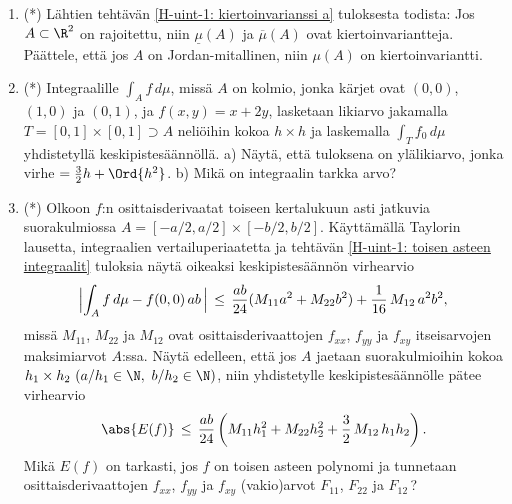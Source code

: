 \begin{enumerate}
\item (*) \label{H-uint-1: kiertoinvarianssi b}
Lähtien tehtävän \ref{H-uint-1: kiertoinvarianssi a} tuloksesta todista: Jos $A\subset\R^2$ on
rajoitettu, niin $\underline{\mu}(A)$ ja $\overline{\mu}(A)$ ovat kiertoinvariantteja.
Päättele, että jos $A$ on Jordan-mitallinen, niin $\mu(A)$ on kiertoinvariantti.

\item (*)
Integraalille $\int_A f\,d\mu$, missä $A$ on kolmio, jonka kärjet ovat $(0,0)$, $(1,0)$ ja
$(0,1)$, ja $f(x,y)=x+2y$, lasketaan likiarvo jakamalla $T=[0,1]\times[0,1] \supset A$
neliöihin kokoa $h \times h$ ja laskemalla $\int_T f_0\,d\mu$ yhdistetyllä keskipistesäännöllä.
a) Näytä, että tuloksena on ylälikiarvo, jonka virhe $=\tfrac{3}{2}h+\Ord{h^2}$. \newline
b) Mikä on integraalin tarkka arvo? 

\item (*) \label{H-uint-1: kp-virhearvio}
Olkoon $f$:n osittaisderivaatat toiseen kertalukuun asti jatkuvia suorakulmiossa
$A=[-a/2,a/2]\times[-b/2,b/2]$. Käyttämällä Taylorin lausetta, integraalien vertailuperiaatetta
ja tehtävän \ref{H-uint-1: toisen asteen integraalit} tuloksia näytä oikeaksi keskipistesäännön
virhearvio
\[
\Bigl|\int_A f\,d\mu - f(0,0)\,ab\,\Bigr|\,\le\,\frac{ab}{24}(M_{11}a^2+M_{22}b^2)
                                                +\frac{1}{16}\,M_{12}\,a^2b^2,
\]
missä $M_{11}$, $M_{22}$ ja $M_{12}$ ovat osittaisderivaattojen $f_{xx}$, $f_{yy}$ ja $f_{xy}$
itseisarvojen maksimiarvot $A$:ssa. Näytä edelleen, että jos $A$ jaetaan suorakulmioihin
kokoa $h_1 \times h_2\ (a/h_1\in\N,\ b/h_2\in\N)$, niin yhdistetylle keskipistesäännölle
pätee virhearvio
\[
\abs{E(f)}\,\le\,\frac{ab}{24}\left(M_{11}h_1^2+M_{22}h_2^2+\frac{3}{2}\,M_{12}\,h_1h_2\right).
\]
Mikä $E(f)$ on tarkasti, jos $f$ on toisen asteen polynomi ja tunnetaan osittaisderivaattojen
$f_{xx}$, $f_{yy}$ ja $f_{xy}$ (vakio)arvot $F_{11}$, $F_{22}$ ja $F_{12}\,$?

\end{enumerate}